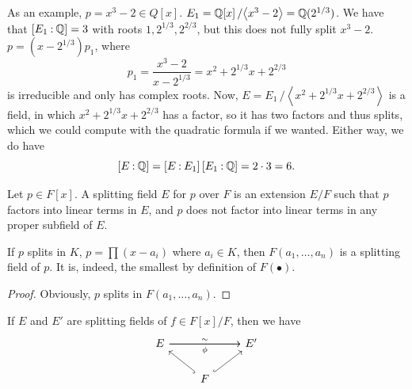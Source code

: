 As an example, $p = x^3 - 2 \in Q[x]$. $E_1 = \mathbb Q[x] \,/\! \left<x^3 - 2\right> = \mathbb Q(2^{1/3})$. We have that $\coor{E_1:\QQ} = 3$ with roots $1, 2^{1/3}, 2^{2/3}$, but this does not fully split $x^3 - 2$. $p = (x - 2^{1/3}) p_1$, where 
\[ p_1 = \frac{x^3 - 2}{x - 2^{1/3}} = x^2 + 2^{1/3} x + 2^{2/3} \]
is irreducible and only has complex roots. Now, $E = E_1 \,/\! \left<x^2 + 2^{1/3} x + 2^{2/3}\right>$ is a field, in which $x^2 + 2^{1/3} x + 2^{2/3}$ has a factor, so it has two factors and thus splits, which we could compute with the quadratic formula if we wanted. Either way, we do have
\[ \coor{E:\QQ} = \coor{E:E_1} \coor{E_1:\QQ} = 2 \cdot 3 = 6. \] \vspace{-20pt}
\begin{definition}
    Let $p \in F[x]$. A splitting field $E$ for $p$ over $F$ is an extension $E/F$ such that $p$ factors into linear terms in $E$, and $p$ does not factor into linear terms in any proper subfield of $E$.
\end{definition}

\newpage
\begin{claim}
    If $p$ splits in $K$, $p = \prod (x - a_i)$ where $a_i \in K$, then $F(a_1, \dots, a_n)$ is a splitting field of $p$. It is, indeed, the smallest by definition of $F(\bullet)$.
\end{claim}
\begin{proof}
    Obviously, $p$ splits in $F(a_1, \dots, a_n)$.
\end{proof}
\begin{theorem}
    If $E$ and $E'$ are splitting fields of $f \in F[x]/F$, then we have
    \[ \begin{tikzcd} E \arrow[rr, "\sim"] \arrow[rr, "\phi"'] & & E' \\ & F \arrow[ul, hookrightarrow] \arrow[ur, hookrightarrow] & \end{tikzcd} \]
\end{theorem}
